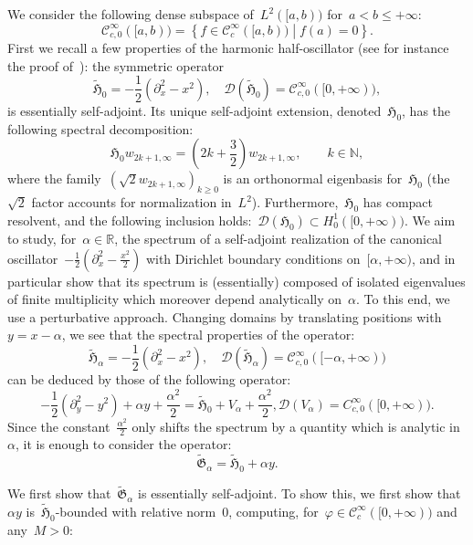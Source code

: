 \documentclass[10pt]{article}
\newcommand{\R}{\mathbb{R}}
\newcommand{\N}{\mathbb N}
\newcommand{\1}{\mathbbm 1}
\begin{document}
    We consider the following dense subspace of~$L^2([a,b))$ for~$a<b\leq +\infty$:
    \[\mathcal C^\infty_{c,0}([a,b)) = \left\{f\in \mathcal C^\infty_c([a,b))\middle| f(a)=0\right\}.\]
    First we recall a few properties of the harmonic half-oscillator (see for instance the proof of~\cite[Proposition S1.2.10]{BS12}): the symmetric operator
   ~$$ \widetilde{\mathfrak H}_0 = -\frac12(\partial_x^2-x^2),\quad \mathcal D(\widetilde{\mathfrak H}_0) = \mathcal C^\infty_{c,0}([0,+\infty)),$$
    is essentially self-adjoint. Its unique self-adjoint extension, denoted~$\mathfrak{H}_0$, has the following spectral decomposition:
    \begin{equation}
        \label{harmonic_half_oscillator}
        \mathfrak{H}_0 w_{2k+1,\infty} = \left(2k + \frac32\right) w_{2k+1,\infty},\qquad k\in \N,
    \end{equation}
    where the family~$(\sqrt 2 w_{2k+1,\infty})_{k\geq 0}$ is an orthonormal eigenbasis for~$\mathfrak{H}_0$ (the~$\sqrt 2$ factor accounts for normalization in~$L^2$). Furthermore,~$\mathfrak{H}_0$ has compact resolvent, and the following inclusion holds:~$\mathcal D({\mathfrak{H}}_0) \subset H_0^1([0,+\infty))$.
    We aim to study, for~$\alpha\in\R$, the spectrum of a self-adjoint realization of the canonical oscillator~$-\frac12(\partial_x^2-\frac{x^2}2)$ with Dirichlet boundary conditions on~$[\alpha,+\infty)$, and in particular show that its spectrum is (essentially) composed of isolated eigenvalues of finite multiplicity which moreover depend analytically on~$\alpha$.
    To this end, we use a perturbative approach. Changing domains by translating positions with~$y = x-\alpha$, we see that the spectral properties of the operator:
   ~$$\widetilde{\mathfrak H}_\alpha = -\frac12(\partial_x^2-x^2),\quad \mathcal D(\widetilde{\mathfrak H}_\alpha) = \mathcal C^\infty_{c,0}([-\alpha,+\infty))$$
    can be deduced by those of the following operator:
   ~$$-\frac12(\partial_y^2-y^2) + \alpha y +\frac{\alpha^2}2 = \widetilde{\mathfrak H}_0 + V_\alpha + \frac{\alpha^2}2, \mathcal D(V_\alpha) = C^\infty_{c,0}([0,+\infty)).$$
    Since the constant~$\frac{\alpha^2}2$ only shifts the spectrum by a quantity which is analytic in~$\alpha$, it is enough to consider the operator:
   ~$$\widetilde{\mathfrak{G}}_\alpha = \widetilde{\mathfrak{H}}_0 + \alpha y.$$

    We first show that~$\widetilde{\mathfrak{G}}_\alpha$ is essentially self-adjoint.
    To show this, we first show that~$\alpha y$ is~$\widetilde{\mathfrak H}_0$-bounded with relative norm~$0$, computing, for~$\varphi \in \mathcal C^\infty_c([0,+\infty))$ and any~$M>0$:
\end{document}
